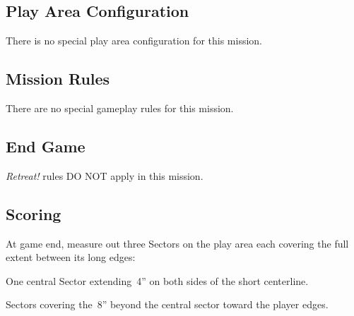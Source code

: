 \label{mission:frontline}

\subsection{Play Area Configuration}

There is no special play area configuration for this mission.

\subsection{Mission Rules}

There are no special gameplay rules for this mission.

\subsection{End Game}

\emph{Retreat!} rules DO NOT apply in this mission.


\subsection{Scoring}


  At game end, measure out three Sectors on the
play area each covering the full extent between its long edges:

\begin{squishitemize}
\item One central Sector extending~4'' on both sides of the short
  centerline.
\item Sectors covering the~8'' beyond the central sector toward the
  player edges.
\end{squishitemize}


